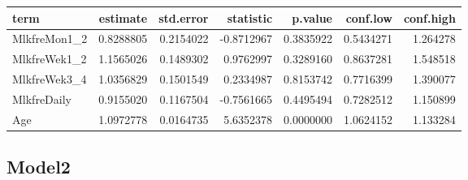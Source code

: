 \documentclass[]{article}
\newenvironment{Shaded}{\begin{snugshade}}{\end{snugshade}}
\newcommand{\DataTypeTok}[1]{\textcolor[rgb]{0.13,0.29,0.53}{#1}}
\newcommand{\KeywordTok}[1]{\textcolor[rgb]{0.13,0.29,0.53}{\textbf{#1}}}
\newcommand{\NormalTok}[1]{#1}
\newcommand{\OperatorTok}[1]{\textcolor[rgb]{0.81,0.36,0.00}{\textbf{#1}}}
\newcommand{\OtherTok}[1]{\textcolor[rgb]{0.56,0.35,0.01}{#1}}
\newcommand{\StringTok}[1]{\textcolor[rgb]{0.31,0.60,0.02}{#1}}
\begin{document}
\begin{longtable}[]{@{}lrrrrrr@{}}
\toprule
term & estimate & std.error & statistic & p.value & conf.low &
conf.high\tabularnewline
\midrule
\endhead
MlkfreMon1\_2 & 0.8288805 & 0.2154022 & -0.8712967 & 0.3835922 &
0.5434271 & 1.264278\tabularnewline
MlkfreWek1\_2 & 1.1565026 & 0.1489302 & 0.9762997 & 0.3289160 &
0.8637281 & 1.548518\tabularnewline
MlkfreWek3\_4 & 1.0356829 & 0.1501549 & 0.2334987 & 0.8153742 &
0.7716399 & 1.390077\tabularnewline
MlkfreDaily & 0.9155020 & 0.1167504 & -0.7561665 & 0.4495494 & 0.7282512
& 1.150899\tabularnewline
Age & 1.0972778 & 0.0164735 & 5.6352378 & 0.0000000 & 1.0624152 &
1.133284\tabularnewline
\bottomrule
\end{longtable}

\hypertarget{model2-3}{%
\subsection{Model2}\label{model2-3}}

\begin{Shaded}
\end{Shaded}
\end{document}
